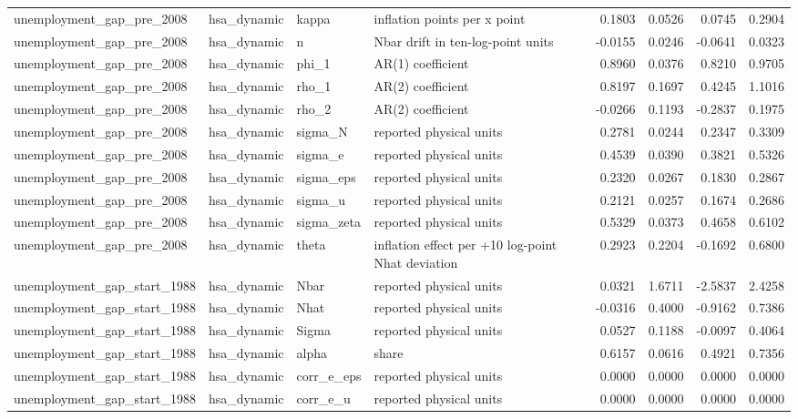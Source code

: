 \begin{tabular}{llllrrrr}
unemployment\_gap\_pre\_2008 & hsa\_dynamic & kappa & inflation points per x point & 0.1803 & 0.0526 & 0.0745 & 0.2904 \\
unemployment\_gap\_pre\_2008 & hsa\_dynamic & n & Nbar drift in ten-log-point units & -0.0155 & 0.0246 & -0.0641 & 0.0323 \\
unemployment\_gap\_pre\_2008 & hsa\_dynamic & phi\_1 & AR(1) coefficient & 0.8960 & 0.0376 & 0.8210 & 0.9705 \\
unemployment\_gap\_pre\_2008 & hsa\_dynamic & rho\_1 & AR(2) coefficient & 0.8197 & 0.1697 & 0.4245 & 1.1016 \\
unemployment\_gap\_pre\_2008 & hsa\_dynamic & rho\_2 & AR(2) coefficient & -0.0266 & 0.1193 & -0.2837 & 0.1975 \\
unemployment\_gap\_pre\_2008 & hsa\_dynamic & sigma\_N & reported physical units & 0.2781 & 0.0244 & 0.2347 & 0.3309 \\
unemployment\_gap\_pre\_2008 & hsa\_dynamic & sigma\_e & reported physical units & 0.4539 & 0.0390 & 0.3821 & 0.5326 \\
unemployment\_gap\_pre\_2008 & hsa\_dynamic & sigma\_eps & reported physical units & 0.2320 & 0.0267 & 0.1830 & 0.2867 \\
unemployment\_gap\_pre\_2008 & hsa\_dynamic & sigma\_u & reported physical units & 0.2121 & 0.0257 & 0.1674 & 0.2686 \\
unemployment\_gap\_pre\_2008 & hsa\_dynamic & sigma\_zeta & reported physical units & 0.5329 & 0.0373 & 0.4658 & 0.6102 \\
unemployment\_gap\_pre\_2008 & hsa\_dynamic & theta & inflation effect per +10 log-point Nhat deviation & 0.2923 & 0.2204 & -0.1692 & 0.6800 \\
unemployment\_gap\_start\_1988 & hsa\_dynamic & Nbar & reported physical units & 0.0321 & 1.6711 & -2.5837 & 2.4258 \\
unemployment\_gap\_start\_1988 & hsa\_dynamic & Nhat & reported physical units & -0.0316 & 0.4000 & -0.9162 & 0.7386 \\
unemployment\_gap\_start\_1988 & hsa\_dynamic & Sigma & reported physical units & 0.0527 & 0.1188 & -0.0097 & 0.4064 \\
unemployment\_gap\_start\_1988 & hsa\_dynamic & alpha & share & 0.6157 & 0.0616 & 0.4921 & 0.7356 \\
unemployment\_gap\_start\_1988 & hsa\_dynamic & corr\_e\_eps & reported physical units & 0.0000 & 0.0000 & 0.0000 & 0.0000 \\
unemployment\_gap\_start\_1988 & hsa\_dynamic & corr\_e\_u & reported physical units & 0.0000 & 0.0000 & 0.0000 & 0.0000 \\

\end{tabular}
